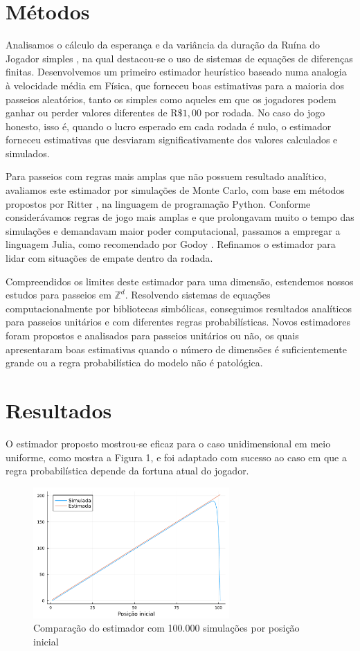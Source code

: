 \documentclass[a4paper,10pt,twocolumn]{article}
\begin{document}
\section{Métodos}

Analisamos o cálculo da esperança e da variância da duração da
Ruína do Jogador simples \cite{andel_variance_2012}, na qual destacou-se o uso de
sistemas de equações de diferenças finitas. Desenvolvemos um primeiro
estimador heurístico baseado numa analogia à velocidade média em Física, que
forneceu boas estimativas  para a maioria dos passeios aleatórios, tanto os simples 
como aqueles em que os jogadores podem ganhar ou perder valores
diferentes de $\mathrm{R}\$1,00$ por rodada. No caso do jogo honesto, isso é, quando
o lucro esperado em cada rodada é nulo, o estimador forneceu estimativas que
desviaram significativamente dos valores calculados e simulados.

Para passeios com regras mais amplas que não possuem resultado analítico,
avaliamos este estimador por simulações de Monte Carlo, com base em
métodos propostos por Ritter \cite{ritter_determining_2011}, na linguagem de
programação Python. Conforme considerávamos regras de jogo mais amplas e que
prolongavam muito o tempo das simulações e demandavam maior poder computacional,
passamos a empregar a linguagem Julia, como recomendado por Godoy
\cite{godoy_evaluating_2023}. Refinamos o estimador para lidar com situações de empate
dentro da rodada.

Compreendidos os limites deste estimador para uma dimensão, estendemos nossos estudos para
passeios em $\mathbb{Z}^d$. Resolvendo
sistemas de equações computacionalmente por bibliotecas simbólicas, conseguimos
resultados analíticos para passeios unitários e com diferentes regras probabilísticas.
Novos estimadores foram propostos e analisados para passeios unitários ou não, os quais
apresentaram boas estimativas quando o número de dimensões é suficientemente grande ou a 
regra probabilística do modelo não é patológica.

\section{Resultados}

O estimador proposto mostrou-se eficaz para o caso unidimensional em meio
uniforme, como mostra a Figura 1, e foi adaptado com sucesso ao caso em que a regra
probabilística depende da fortuna atual do jogador.

\begin{figure}[H]
    \caption{Comparação do estimador com 100.000 simulações por posição inicial}
    \centering
    \includegraphics[width=7.5cm]{"graficoest.pdf"}
\end{figure}
\end{document}

